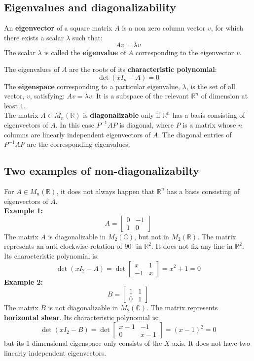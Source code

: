 \documentclass[a4paper, 9pt]{extarticle}
\begin{document}
\subsection{Eigenvalues and diagonalizability}
\begin{definitionbox}{}{}
  An \textbf{eigenvector} of a square matrix $A$ is a non zero column vector $v$, for which there exists a scalar $\lambda$ such that:
  $$
    Av = \lambda v
  $$
  The scalar $\lambda$ is called the \textbf{eigenvalue} of $A$ corresponding to the eigenvector $v$.
\end{definitionbox}
\noindent The eigenvalues of $A$ are the roots of its \textbf{characteristic polynomial}:
$$
  \det(xI_n - A) = 0
$$
The $\textbf{eigenspace}$ corresponding to a particular eigenvalue, $\lambda$, is the set of all vector, $v$, satisfying: $Av = \lambda v$. It is a subspace of the relevant $\mathbb{R}^n$ of dimension at least $1$. \\[2ex]
The matrix $A \in M_n(\mathbb{R})$ is \textbf{diagonalizable} only if $\mathbb{R}^n$ has a basis consisting of eigenvectors of $A$. In this case $P^{-1}AP$ is diagonal, where $P$ is a matrix whose $n$ columns are linearly independent eigenvectors of $A$. The diagonal entries of $P^{-1}AP$ are the corresponding eigenvalues.
\subsection{Two examples of non-diagonalizabilty}
For $A \in M_n(\mathbb{R})$, it does not always happen that $\mathbb{R}^n$ has a basis consisting of eigenvectors of $A$.\\[2ex]
\noindent \textbf{Example 1:}
$$A = \begin{bmatrix}
    0 & -1 \\
    1 & 0
  \end{bmatrix}$$
The matrix $A$ is diagonalizable in $M_2(\mathbb{C})$, but not in $M_2(\mathbb{R})$. The matrix represents an anti-clockwise rotation of $90^{\circ}$ in $\mathbb{R}^2$. It does not fix any line in $\mathbb{R}^2$. Its characteristic polynomial is:
$$
  \det(xI_2 - A) = \det\begin{bmatrix}
    x  & 1 \\
    -1 & x
  \end{bmatrix} = x^2 + 1 = 0
$$
\noindent\textbf{Example 2:}
$$B = \begin{bmatrix}
    1 & 1 \\
    0 & 1
  \end{bmatrix}$$
The matrix $B$ is not diagonalizable in $M_2(\mathbb{C})$. The matrix represents \textbf{horizontal shear}. Its characteristic polynomial is:
$$
  \det(xI_2 - B) = \det\begin{bmatrix}
    x-1 & -1  \\
    0   & x-1
  \end{bmatrix} = (x-1)^2 = 0
$$
but its 1-dimensional eigenspace only consists of the $X$-axis. It does not have two linearly independent eigenvectors.
\end{document}
